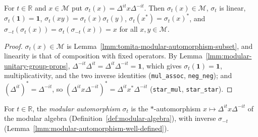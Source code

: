 \begin{lemma}
    \label{lmm:modular-automorphism-well-defined}
    \leanok
    For $t \in \mathbb{R}$ and $x \in \mathcal{M}$ put $\sigma_t(x) = \Delta^{it}x\Delta^{-it}$. Then $\sigma_t(x) \in \mathcal{M}$, $\sigma_t$ is linear, $\sigma_t(\mathbf{1}) = \mathbf{1}$, $\sigma_t(xy) = \sigma_t(x)\sigma_t(y)$, $\sigma_t(x^*) = \sigma_t(x)^*$, and $\sigma_{-t}(\sigma_t(x)) = \sigma_t(\sigma_{-t}(x)) = x$ for all $x, y \in \mathcal{M}$.
\end{lemma}
\begin{proof}
    \leanok
    $\sigma_t(x) \in \mathcal{M}$ is Lemma~\ref{lmm:tomita-modular-automorphism-subset}, and linearity is that of composition with fixed operators. By Lemma~\ref{lmm:modular-unitary-group-props}, $\Delta^{-it}\Delta^{it} = \Delta^{it}\Delta^{-it} = \mathbf{1}$, which gives $\sigma_t(\mathbf{1}) = \mathbf{1}$, multiplicativity, and the two inverse identities (\texttt{mul\_assoc}, \texttt{neg\_neg}); and $(\Delta^{it})^* = \Delta^{-it}$, so $(\Delta^{it}x\Delta^{-it})^* = \Delta^{it}x^*\Delta^{-it}$ (\texttt{star\_mul}, \texttt{star\_star}).
\end{proof}

\begin{definition}
    \label{def:modular-automorphism}
    \leanok
    For $t \in \mathbb{R}$, the \emph{modular automorphism} $\sigma_t$ is the $*$-automorphism $x \mapsto \Delta^{it}x\Delta^{-it}$ of the modular algebra (Definition~\ref{def:modular-algebra}), with inverse $\sigma_{-t}$ (Lemma~\ref{lmm:modular-automorphism-well-defined}).
\end{definition}

